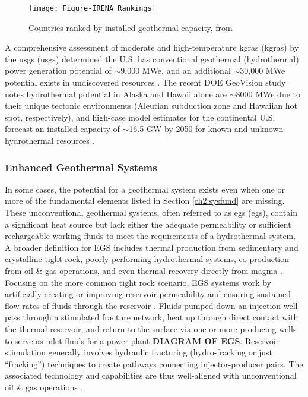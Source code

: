 \begin{figure}[htbp]
\centering
\texttt{[image: Figure-IRENA\_Rankings]}
\caption[Country rankings, installed geothermal capacity ]{Countries ranked by installed geothermal capacity, from \protect\citep{irena_country_2021}}
\label{fig:irena-rank}
\end{figure}

A comprehensive assessment of moderate and high-temperature \acrlong{kgra}s (\acrshort{kgra}s) by the \acrlong{usgs} (\acrshort{usgs}) determined the U.S. has conventional geothermal (hydrothermal) power generation potential of $\sim$9,000 MWe, and an additional $\sim$30,000 MWe potential exists in undiscovered resources \citep{williams_assessment_2008}. The recent DOE GeoVision study notes hydrothermal potential in Alaska and Hawaii alone are $\sim$8000 MWe due to their unique tectonic environments (Aleutian subduction zone and Hawaiian hot spot, respectively), and high-case model estimates for the continental U.S. forecast an installed capacity of $\sim$16.5 GW by 2050 for known and unknown hydrothermal resources \citep{augustine_geovision_2019,hamm_overview_2019}.

\subsubsection{Enhanced Geothermal Systems}\label{ch2:egs}
In some cases, the potential for a geothermal system exists even when one or more of the fundamental elements listed in Section \ref{ch2:sysfund} are missing. These unconventional geothermal systems, often referred to as \acrlong{egs} (\acrshort{egs}), contain a significant heat source but lack either the adequate permeability or sufficient rechargeable working fluids to meet the requirements of a hydrothermal system. A broader definition for EGS includes thermal production from sedimentary and crystalline tight rock, poorly-performing hydrothermal systems, co-production from oil \& gas operations, and even thermal recovery directly from magma \citep{tester_future_2006}. Focusing on the more common tight rock scenario, EGS systems work by artificially creating or improving reservoir permeability and ensuring sustained flow rates of fluids through the reservoir \citep[p.\ 281]{glassley_geothermal_2015}. Fluids pumped down an injection well pass through a stimulated fracture network, heat up through direct contact with the thermal reservoir, and return to the surface via one or more producing wells to serve as inlet fluids for a power plant \textbf{DIAGRAM OF EGS}. Reservoir stimulation generally involves hydraulic fracturing (hydro-fracking or just “fracking”) techniques to create pathways connecting injector-producer pairs. The associated technology and capabilities are thus well-aligned with unconventional oil \& gas operations \citep{petty_synergies_2009}. 

